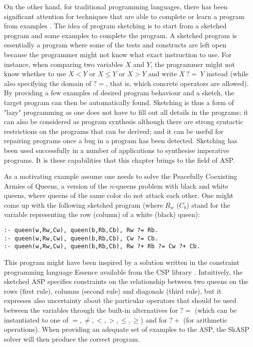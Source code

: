 
On the other hand, for traditional programming languages, there has been significant attention for techniques that are able
to complete \cite{sketching_phd_thesis} or learn a program from examples \cite{gulwani2015inductive}. 
The idea of program sketching is to start from a sketched program and some examples
to complete the program. A sketched program is essentially a program where some of the tests and constructs
are left open because the programmer might not know what exact instruction to use.  For instance, 
when comparing two variables $X$ and $Y$, the programmer might not know whether to use $X < Y$ or $X \leq Y$ or $X > Y$ and write 
$X~{?}{=}~Y$ instead (while also specifying the domain of ${?}{=}$, that is, which concrete operators are allowed). 
By providing a few examples of desired program behaviour and a sketch, the target program can then be automatically found.
Sketching is thus a form of "lazy" programming as one does not have to fill out all details in the programs; 
it can also be considered as program synthesis although there are strong syntactic restrictions on 
the programs that can be derived; and it can be useful for repairing programs once a bug in a program has been detected.
Sketching has been used successfully in a number of applications \cite{sketching_original,sketch_recent,jsketch} to synthesise imperative programs.
It is these capabilities that this chapter brings to the field of ASP.


As a motivating example assume 
one needs to solve %
the Peacefully Coexisting Armies of Queens, a version of the $n$-queens problem with black and white queens, where queens of the same color do not attack each other. 
One might come up with the following sketched program (where 
$R_w$ ($C_b$) stand for the variable representing the row (column) of a white (black) queen): 
\begin{lstlisting}[caption=Peacefully Coexisting Armies of Queens,label=lst:queens,basicstyle=\small\ttfamily]
:- queen(w,Rw,Cw), queen(b,Rb,Cb), Rw ?= Rb.
:- queen(w,Rw,Cw), queen(b,Rb,Cb), Cw ?= Cb.
:- queen(w,Rw,Cw), queen(b,Rb,Cb), Rw ?+ Rb ?= Cw ?+ Cb.
\end{lstlisting}
This program might have been inspired by a solution written in the constraint programming language Essence available from the CSP library \cite{csplib:prob110}.  
Intuitively, the sketched ASP specifies constraints on the relationship between two queens on the rows (first rule), columns (second rule) and diagonals (third rule), %
but it expresses also uncertainty about the particular operators that should be used between the variables 
through the built-in alternatives for ${?}{=}$  (which can be instantiated to one of $=,\neq,<,>,\leq,\geq$) and for ${?}+$ (for arithmetic operations). 
When providing an adequate set of examples to the ASP, the SkASP solver will then produce the correct program.



